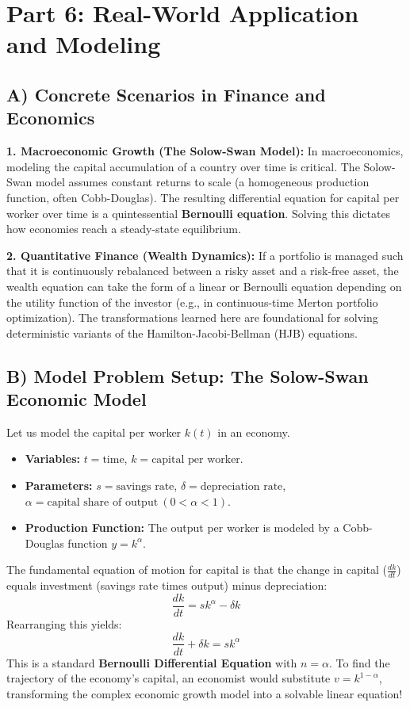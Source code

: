 \documentclass[11pt]{article}
\begin{document}
\newpage
\section{Part 6: Real-World Application and Modeling}

\subsection{A) Concrete Scenarios in Finance and Economics}
\textbf{1. Macroeconomic Growth (The Solow-Swan Model):} In macroeconomics, modeling the capital accumulation of a country over time is critical. The Solow-Swan model assumes constant returns to scale (a homogeneous production function, often Cobb-Douglas). The resulting differential equation for capital per worker over time is a quintessential \textbf{Bernoulli equation}. Solving this dictates how economies reach a steady-state equilibrium.

\textbf{2. Quantitative Finance (Wealth Dynamics):} If a portfolio is managed such that it is continuously rebalanced between a risky asset and a risk-free asset, the wealth equation can take the form of a linear or Bernoulli equation depending on the utility function of the investor (e.g., in continuous-time Merton portfolio optimization). The transformations learned here are foundational for solving deterministic variants of the Hamilton-Jacobi-Bellman (HJB) equations.

\subsection{B) Model Problem Setup: The Solow-Swan Economic Model}
Let us model the capital per worker $k(t)$ in an economy.
\begin{itemize}
    \item \textbf{Variables:} $t = \text{time}$, $k = \text{capital per worker}$.
    \item \textbf{Parameters:} $s = \text{savings rate}$, $\delta = \text{depreciation rate}$, $\alpha = \text{capital share of output} \ (0 < \alpha < 1)$.
    \item \textbf{Production Function:} The output per worker is modeled by a Cobb-Douglas function $y = k^\alpha$.
\end{itemize}
The fundamental equation of motion for capital is that the change in capital ($\frac{dk}{dt}$) equals investment (savings rate times output) minus depreciation:
\[ \frac{dk}{dt} = s k^\alpha - \delta k \]
Rearranging this yields:
\[ \frac{dk}{dt} + \delta k = s k^\alpha \]
This is a standard \textbf{Bernoulli Differential Equation} with $n = \alpha$. To find the trajectory of the economy's capital, an economist would substitute $v = k^{1-\alpha}$, transforming the complex economic growth model into a solvable linear equation!
\end{document}
